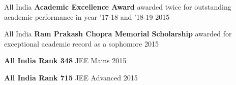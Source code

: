 \begin{cvhonors}

  \cvhonor
  {\ifdefined \ONEPAGE \else All India \fi \textbf{Academic Excellence Award}}
  {awarded twice for outstanding academic performance in year '17-18 and '18-19}
  {}
  {2015}

  \cvhonor
  {\ifdefined \ONEPAGE \else All India \fi  \textbf{Ram Prakash Chopra Memorial Scholarship}}
  {awarded for exceptional academic record as a sophomore }
  {}
  {2015}

  \cvhonor
  {\textbf{All India Rank 348}}
  {JEE Mains}
  {}
  {2015}
  
  \cvhonor
	{\textbf{All India Rank 715}}
	{JEE Advanced}
	{}
	{2015}
	
\end{cvhonors}

